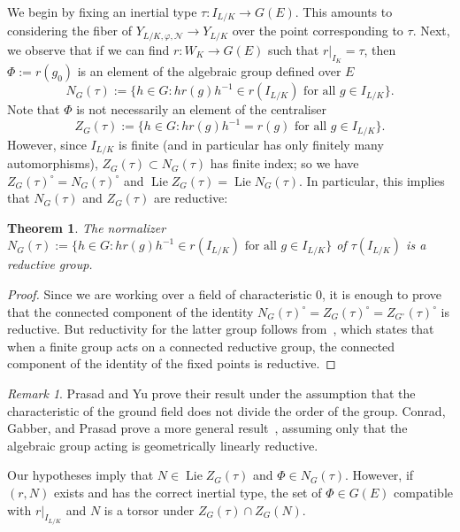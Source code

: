 \documentclass{amsart}
\DeclareMathOperator{\Lie}{Lie}
\newtheorem{theorem}[subsubsection]{Theorem}
\theoremstyle{definition}
\theoremstyle{remark}
\newtheorem{remark}[subsubsection]{Remark}
\newcommand{\mar}[1]{}
\newcommand{\mar}[1]{\marginpar{\raggedright\tiny squirrel #1}}
\begin{document}
We begin by fixing an inertial type $\tau:I_{L/K}\rightarrow G(E)$.  This amounts to considering the fiber of $Y_{L/K,\varphi,\mathcal N}\rightarrow Y_{L/K}$ over the point corresponding to $\tau$.
Next, we observe that if we can find $r:W_K\rightarrow G(E)$ such that
$r|_{I_{K}}=\tau$, then $\Phi:=r(g_0)$ is an element of the algebraic group defined over $E$
\[N_G(\tau):=\{h\in G: hr(g)h^{-1}\in r(I_{L/K})\text{ for all }g\in I_{L/K}\}.\]
Note that $\Phi$ is not necessarily an element of  the
centraliser \[Z_G(\tau):=\{h\in G: hr(g)h^{-1}= r(g)\text{ for all
  }g\in I_{L/K}\}.\] However, since $I_{L/K}$ is finite
(and in particular has only finitely many automorphisms),
$Z_G(\tau)\subset N_G(\tau)$ has finite index; so we have $Z_G(\tau)^\circ=N_G(\tau)^\circ$ and $\Lie Z_G(\tau)=\Lie N_G(\tau)$.  In particular, this implies that $N_G(\tau)$ and $Z_G(\tau)$ are reductive:
\begin{theorem}\label{theorem:centralizer-reductive}%
The normalizer $N_G(\tau):=\{h\in G: hr(g)h^{-1}\in r(I_{L/K})\text{ for all }g\in I_{L/K}\}$ of $\tau(I_{L/K})$ is a reductive group.
\end{theorem}
\begin{proof}
Since we are working over a field of characteristic $0$, it is enough to prove that the connected component of the identity $N_G(\tau)^\circ=Z_G(\tau)^\circ=Z_{G^\circ}(\tau)^\circ$ is reductive.  But reductivity for the latter group follows from~\cite[Theorem 2.1]{MR1893005}, which states that when a finite group acts on a connected reductive group, the connected component of the identity of the fixed points is reductive.
\end{proof}
\begin{remark}
Prasad and Yu prove their result under the assumption that the characteristic of the ground field does not divide the order of the group.  Conrad, Gabber, and Prasad prove a more general result~\cite[Proposition A.8.12]{predbook}, assuming only that the algebraic group acting is geometrically linearly reductive.
\end{remark}

 Our hypotheses imply that $N\in\Lie Z_G(\tau)$ and
  $\Phi\in N_G(\tau)$.  However, if $(r,N)$ exists and has the correct
  inertial type, the set of $\Phi\in G(E)$ compatible with
  $r|_{I_{L/K}}$ and $N$ is a torsor under $Z_G(\tau)\cap
  Z_G(N)$.%
\end{document}
